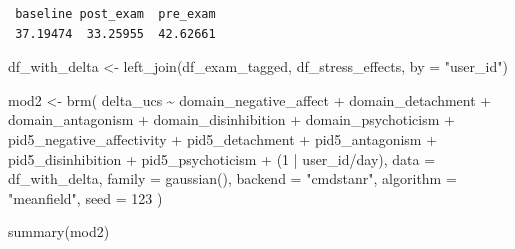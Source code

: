 \documentclass[
  11pt,
  a4paper,
  onecolumn]{article}
\newenvironment{Shaded}{}{}
\newcommand{\AttributeTok}[1]{\textcolor[rgb]{0.84,0.23,0.29}{#1}}
\newcommand{\DecValTok}[1]{\textcolor[rgb]{0.00,0.36,0.77}{#1}}
\newcommand{\FunctionTok}[1]{\textcolor[rgb]{0.44,0.26,0.76}{#1}}
\newcommand{\NormalTok}[1]{\textcolor[rgb]{0.14,0.16,0.18}{#1}}
\newcommand{\OtherTok}[1]{\textcolor[rgb]{0.44,0.26,0.76}{#1}}
\newcommand{\SpecialCharTok}[1]{\textcolor[rgb]{0.00,0.36,0.77}{#1}}
\newcommand{\StringTok}[1]{\textcolor[rgb]{0.01,0.18,0.38}{#1}}
\begin{document}
\begin{verbatim}
 baseline post_exam  pre_exam 
 37.19474  33.25955  42.62661 
\end{verbatim}

\begin{Shaded}
\begin{Highlighting}[]
\NormalTok{df\_with\_delta }\OtherTok{\textless{}{-}} \FunctionTok{left\_join}\NormalTok{(df\_exam\_tagged, df\_stress\_effects,  }\AttributeTok{by =} \StringTok{"user\_id"}\NormalTok{)}
\end{Highlighting}
\end{Shaded}

\begin{Shaded}
\begin{Highlighting}[]
\NormalTok{mod2 }\OtherTok{\textless{}{-}} \FunctionTok{brm}\NormalTok{(}
\NormalTok{  delta\_ucs }\SpecialCharTok{\textasciitilde{}}\NormalTok{ domain\_negative\_affect }\SpecialCharTok{+}\NormalTok{ domain\_detachment }\SpecialCharTok{+}\NormalTok{ domain\_antagonism }\SpecialCharTok{+}
\NormalTok{    domain\_disinhibition }\SpecialCharTok{+}\NormalTok{ domain\_psychoticism }\SpecialCharTok{+}
\NormalTok{    pid5\_negative\_affectivity }\SpecialCharTok{+}\NormalTok{ pid5\_detachment }\SpecialCharTok{+}\NormalTok{ pid5\_antagonism }\SpecialCharTok{+}
\NormalTok{    pid5\_disinhibition }\SpecialCharTok{+}\NormalTok{ pid5\_psychoticism }\SpecialCharTok{+}\NormalTok{ (}\DecValTok{1} \SpecialCharTok{|}\NormalTok{ user\_id}\SpecialCharTok{/}\NormalTok{day),}
  \AttributeTok{data =}\NormalTok{ df\_with\_delta,}
  \AttributeTok{family =} \FunctionTok{gaussian}\NormalTok{(),}
  \AttributeTok{backend =} \StringTok{"cmdstanr"}\NormalTok{,}
  \AttributeTok{algorithm =} \StringTok{"meanfield"}\NormalTok{,}
  \AttributeTok{seed =} \DecValTok{123}
\NormalTok{)}
\end{Highlighting}
\end{Shaded}

\begin{Shaded}
\begin{Highlighting}[]
\FunctionTok{summary}\NormalTok{(mod2)}
\end{Highlighting}
\end{Shaded}
\end{document}
